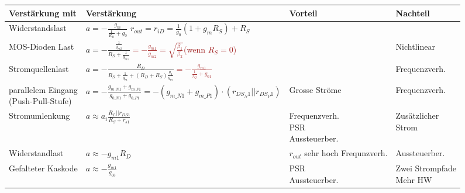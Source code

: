 \begin{tabular}{|l|l|l|l|}
    \hline
    \textbf{Verstärkung mit}  & \textbf{Verstärkung}  & \textbf{Vorteil} & \textbf{Nachteil} \\
    \hline 
    Widerstandslast & \makecell[l]{$a = -\frac{g_m}{\frac{1}{R_D}+g_0}$\\$r_{out} = r_{iD} = \frac{1}{g_0}(1+g_m R_S)+R_S$} & & \\
    \hline
    MOS-Dioden Last & $a = -\frac{\frac{1}{g_{m2}}}{R_S+\frac{1}{g_{m1}}}$\textcolor{brown}{$=-\frac{g_{m1}}{g_{m2}}= \sqrt{\frac{\beta_1}{\beta_2}}$(wenn $R_S = 0$)}& & Nichtlinear \\
    \hline
    Stromquellenlast & $a = -\frac{R_D}{R_S+\frac{1}{g_m}+(R_D+R_S)\frac{g_0}{g_m}}$\textcolor{brown}{$=-\frac{g_{m1}}{\frac{1}{r_Q}+g_{01}}$} & & Frequenzverh. \\
    \hline
    \makecell[l]{parallelem Eingang\\(Push-Pull-Stufe)} & $a= -\frac{g_{m\_N1}+g_{m\_P1}}{g_{0\_N1}+g_{0\_P1}}=-(g_{m\_N1}+g_{m\_P1})\cdot(r_{DS_N1}||r_{DS_P1})$ & Grosse Ströme & Frequenzverh. \\
    \hline
    Stromumlenkung & $a\approx a_i\frac{R_L||r_{DS3}}{R_S+r_{s1}}$ & \makecell[l]{Frequenzverh. \\PSR \\Aussteuerber.} & \makecell[l]{Zusätzlicher \\Strom} \\
    \hline
    Widerstandlast & $a\approx-g_{m1}R_D$ & \makecell[l]{$r_{out}$ sehr hoch \\Frequnzverh.} & Aussteuerber.\\
    \hline
    Gefalteter Kaskode & $a\approx -\frac{g_{m1}}{g_{03}}$& \makecell[l]{PSR \\Aussteuerber.} & \makecell[l]{Zwei Strompfade \\Mehr HW}\\
    \hline
\end{tabular}
